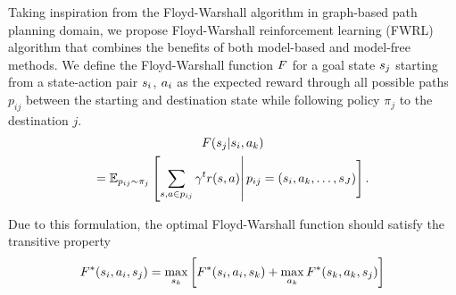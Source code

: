 %
%
%
%
Taking inspiration from the Floyd-Warshall algorithm in graph-based path planning domain,
we propose Floyd-Warshall reinforcement learning (FWRL) algorithm that combines the
benefits of both model-based and model-free methods.
We define the Floyd-Warshall function $F$ for a goal state $s_j$ starting from a
state-action pair $s_i$, $a_i$
as the expected reward through all possible paths $p_{ij}$ between the starting and
destination state while following policy $\pi_{j}$ to the destination $j$.
%
\begin{multline}
F(s_j | s_i, a_k) \\
= \mathbb{E}_{p_{ij} \sim \pi_{j}}\left[
\sum_{s, a \in p_{ij} } \gamma^{t} r(s, a) \right| p_{ij} = (s_i, a_k, \dots, s_J) \Biggr] \, .
\end{multline}
%

Due to this formulation, the optimal Floyd-Warshall function should satisfy the transitive property
\begin{align}
F^*(s_i, a_i, s_j) = \max_{s_k} \left[
F^*(s_i, a_i, s_k)
+ \max_{a_k}F^*(s_k, a_k, s_j) \right]
\label{eq:transitive-fw}
\end{align}

